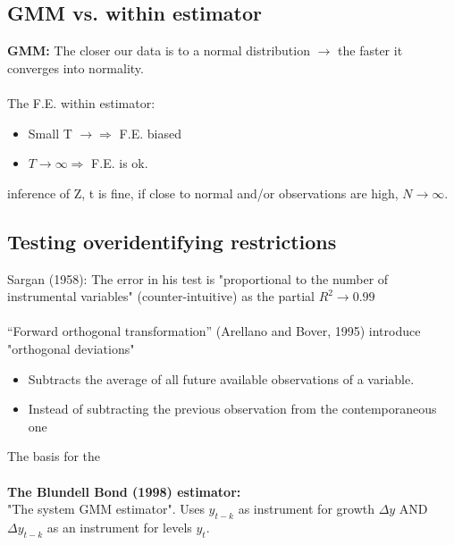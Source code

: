 \begin{multicols}{2}
 \subsection{GMM vs. within estimator}
 \textbf{GMM:} The closer our data is to a normal distribution $\rightarrow$ the faster it converges into normality.
 \\ \\
 The F.E. within estimator:
 \begin{itemize}
  \item Small T $\rightarrow\Rightarrow$ F.E. biased
  \item $T\rightarrow\infty\Rightarrow$ F.E. is ok.
 \end{itemize}

 inference of Z, t is fine, if close to normal and/or observations are high, $N\rightarrow\infty$.

 \subsection{Testing overidentifying restrictions}
Sargan (1958): The error in his test is "proportional to the number of instrumental variables" (counter-intuitive) as the partial $R^2\rightarrow 0.99$
\\ \\
“Forward orthogonal transformation” (Arellano and Bover, 1995) introduce "orthogonal deviations"
 \begin{itemize}
   \item Subtracts the average of all future available observations of a variable.
   \item Instead of subtracting the previous observation from the contemporaneous one
 \end{itemize}
 The basis for the\\
 \\
\textbf{The Blundell Bond (1998) estimator:}\\
"The system GMM estimator". Uses $y_{t-k}$ as instrument for growth $\Delta y$ AND $\Delta y_{t-k}$ as an instrument for levels $y_t$.



\end{multicols}





